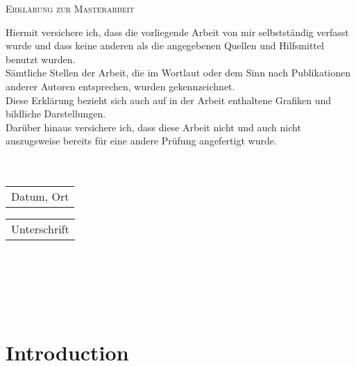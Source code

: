 \documentclass[11pt,titlepage]{article}
\theoremstyle{definition}
\theoremstyle{remark}
\begin{document}
	\thispagestyle{empty}
		\vspace*{1cm}
		\LARGE\textsc{Erklärung zur Masterarbeit}
		
		\vspace{1.5cm}
		
		\normalsize 
		Hiermit versichere ich, dass die vorliegende Arbeit von mir selbstständig verfasst wurde und dass keine anderen als die angegebenen Quellen und Hilfsmittel benutzt wurden.\\ Sämtliche Stellen der Arbeit, die im Wortlaut oder dem Sinn nach Publikationen anderer Autoren entsprechen, wurden gekennzeichnet.\\
		Diese Erklärung bezieht sich auch auf in der Arbeit enthaltene Grafiken und bildliche Darstellungen.\\
		Darüber hinaus versichere ich, dass diese Arbeit nicht und auch nicht auszugsweise bereits für eine andere Prüfung angefertigt wurde. 
		\ \\
		\ \\
		\ \\
		\begin{minipage}{0.57\textwidth}
			\begin{tabular}{@{}l@{}}\hline
				Datum, Ort \hspace{4.2cm}
			\end{tabular}
		\end{minipage}
		\hfill
		\begin{minipage}{0.43\textwidth} 
			\begin{tabular}{@{}l@{}}\hline
				Unterschrift \hspace{4.2cm}
			\end{tabular}
		\end{minipage}
		
	\newpage  \
	\thispagestyle{empty}
	
	\newpage  \
	\thispagestyle{empty}
	
	\tableofcontents
	
	\newpage
	\thispagestyle{empty}
	\ 
	\newpage
	
	\setcounter{page}{1}
	
	\section*{Introduction}
	
\end{document}
